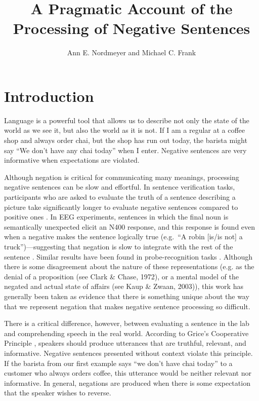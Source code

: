 \documentclass[man]{apa2}
\title{A Pragmatic Account of the Processing of Negative Sentences}
\author{Ann E. Nordmeyer and Michael C. Frank}
\begin{document}
\maketitle


\section{Introduction}

Language is a powerful tool that allows us to describe not only the state of the world as we see it, but also the world as it is not.  If I am a regular at a coffee shop and always order chai, but the shop has run out today, the barista might say ``We don't have any chai today'' when I enter.  Negative sentences are very informative when expectations are violated.

Although negation is critical for communicating many meanings, processing negative sentences can be slow and effortful.  In sentence verification tasks, participants who are asked to evaluate the truth of a sentence describing a picture take significantly longer to evaluate negative sentences compared to positive ones \cite{hclark1972, carpenter1975, just1971, just1976}. In EEG experiments, sentences in which the final noun is semantically unexpected elicit an N400 response, and this response is found even when a negative makes the sentence logically true (e.g.\ ``A robin [is/is not] a truck'')---suggesting that negation is slow to integrate with the rest of the sentence \cite{fischler1983, ludtke2008}.  Similar results have been found in probe-recognition tasks \cite{kaup2003, kaup2006, hasson2006}. Although there is some disagreement about the nature of these representations (e.g. as the denial of a proposition (see Clark & Chase, 1972), or a mental model of the negated and actual state of affairs (see Kaup & Zwaan, 2003)), this work has generally been taken as evidence that there is something unique about the way that we represent negation that makes negative sentence processing so difficult.  

There is a critical difference, however, between evaluating a sentence in the lab and comprehending speech in the real world. According to Grice's Cooperative Principle \cite{grice1975}, speakers should produce utterances that are truthful, relevant, and informative.  Negative sentences presented without context violate this principle.  If the barista from our first example says ``we don't have chai today'' to a customer who always orders coffee, this utterance would be neither relevant nor informative.  In general, negations are produced when there is some expectation that the speaker wishes to reverse.  
\end{document}
